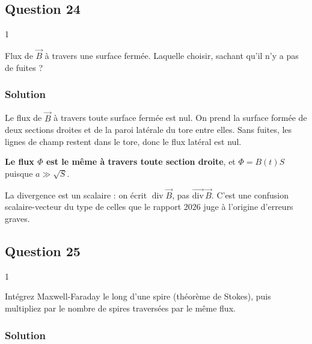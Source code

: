 \documentclass[11pt,a4paper]{article}
\newcommand{\equationajustee}[1]{%
  \sbox{\boiteequation}{$\displaystyle #1$}%
  \ifdim\wd\boiteequation>\linewidth
    \[\resizebox{\linewidth}{!}{\usebox{\boiteequation}}\]%
  \else
    \[#1\]%
  \fi}
\begin{document}
\hypertarget{question-24}{%
\subsection{Question 24}\label{question-24}}

\begin{indication}{1}

Flux de \(\vec B\) à travers une surface fermée. Laquelle choisir, sachant qu'il n'y a pas de fuites ?

\end{indication}

\hypertarget{solution-23}{%
\subsubsection{Solution}\label{solution-23}}

\equationajustee{\boxed{\operatorname{div}\vec B=0}}

Le flux de \(\vec B\) à travers toute surface fermée est nul. On prend la surface formée de deux sections droites et de la paroi latérale du tore entre elles. Sans fuites, les lignes de champ restent dans le tore, donc le flux latéral est nul.

\textbf{Le flux \(\Phi\) est le même à travers toute section droite}, et \(\Phi=B(t)S\) puisque \(a\gg\sqrt S\).

\begin{piege}

La divergence est un scalaire : on écrit \(\operatorname{div}\vec B\), pas \(\overrightarrow{\mathrm{div}}\,\vec B\). C'est une confusion scalaire-vecteur du type de celles que le rapport 2026 juge à l'origine d'erreurs graves.

\end{piege}

\hypertarget{question-25}{%
\subsection{Question 25}\label{question-25}}

\begin{indication}{1}

Intégrez Maxwell-Faraday le long d'une spire (théorème de Stokes), puis multipliez par le nombre de spires traversées par le même flux.

\end{indication}

\hypertarget{solution-24}{%
\subsubsection{Solution}\label{solution-24}}
\end{document}
